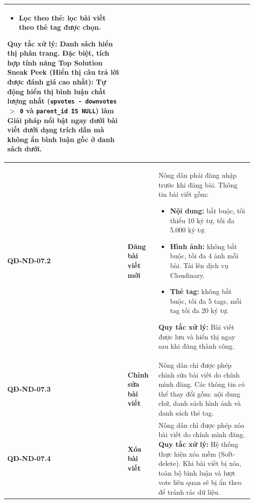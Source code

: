 \documentclass[12pt,a4paper]{article}
\begin{document}
\begin{longtable}{|
        >{\raggedright\arraybackslash}p{2.2cm}|
        >{\raggedright\arraybackslash}p{2.8cm}|
        >{\raggedright\arraybackslash}p{9.8cm}|}
\begin{itemize}[leftmargin=*,topsep=2pt,itemsep=1pt]
        \item \textbf{Lọc theo thẻ:} lọc bài viết theo thẻ tag được chọn.
    \end{itemize}
    \textbf{Quy tắc xử lý:} Danh sách hiển thị phân trang. Đặc biệt, tích hợp tính năng \textbf{Top Solution Sneak Peek} (Hiển thị câu trả lời được đánh giá cao nhất): Tự động hiển thị bình luận chất lượng nhất (\texttt{upvotes - downvotes $>$ 0} và \texttt{parent\_id IS NULL}) làm Giải pháp nổi bật ngay dưới bài viết dưới dạng trích dẫn mà không ẩn bình luận gốc ở danh sách dưới. \\
    \hline
    \textbf{QĐ-ND-07.2}  & \textbf{Đăng bài viết mới}          &
    Nông dân phải đăng nhập trước khi đăng bài. Thông tin bài viết gồm:
    \begin{itemize}[leftmargin=*,topsep=2pt,itemsep=1pt]
        \item \textbf{Nội dung:} bắt buộc, tối thiểu 10 ký tự, tối đa 5.000 ký tự.
        \item \textbf{Hình ảnh:} không bắt buộc, tối đa 4 ảnh mỗi bài. Tải lên dịch vụ Cloudinary.
        \item \textbf{Thẻ tag:} không bắt buộc, tối đa 5 tags, mỗi tag tối đa 20 ký tự.
    \end{itemize}
    \textbf{Quy tắc xử lý:} Bài viết được lưu và hiển thị ngay sau khi đăng thành công.                                                                                                                                                                                                                                                                                                         \\
    \hline
    \textbf{QĐ-ND-07.3}  & \textbf{Chỉnh sửa bài viết}         &
    Nông dân chỉ được phép chỉnh sửa bài viết do chính mình đăng. Các thông tin có thể thay đổi gồm: nội dung chữ, danh sách hình ảnh và danh sách thẻ tag.                                                                                                                                                                                                                                     \\
    \hline
    \textbf{QĐ-ND-07.4}  & \textbf{Xóa bài viết}               &
    Nông dân chỉ được phép xóa bài viết do chính mình đăng. \newline
    \textbf{Quy tắc xử lý:} Hệ thống thực hiện xóa mềm (Soft-delete). Khi bài viết bị xóa, toàn bộ bình luận và lượt vote liên quan sẽ bị ẩn theo để tránh rác dữ liệu.                                                                                                                                                                                                                         \\

\end{longtable}
\end{document}
